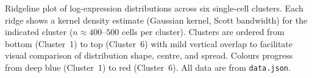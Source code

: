 \caption{Ridgeline plot of log-expression distributions across six single-cell clusters.
Each ridge shows a kernel density estimate (Gaussian kernel, Scott bandwidth) for the
indicated cluster ($n \approx 400$–$500$ cells per cluster). Clusters are ordered from
bottom (Cluster~1) to top (Cluster~6) with mild vertical overlap to facilitate visual
comparison of distribution shape, centre, and spread. Colours progress from deep blue
(Cluster~1) to red (Cluster~6). All data are from \texttt{data.json}.}
